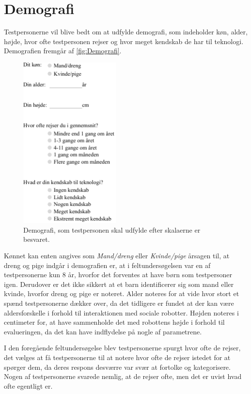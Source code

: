 \section{Demografi}
\label{Demografi}
%
Testpersonerne vil blive bedt om at udfylde demografi, som indeholder køn, alder, højde, hvor ofte testpersonen rejser og hvor meget kendskab de har til teknologi. Demografien fremgår af \autoref{fig:Demografi}.
%
\begin{figure}[H]
\centering
\includegraphics[width = 0.45\textwidth]{Figure/TestdesignEvaluering/Demografi} 
\caption{Demografi, som testpersonen skal udfylde efter skalaerne er besvaret.}
\label{fig:Demografi}
\end{figure}
\noindent
%
Kønnet kan enten angives som \textit{Mand/dreng} eller \textit{Kvinde/pige} årsagen til, at dreng og pige indgår i demografien er, at i feltundersøgelsen var en af testpersonerne kun 8 år, hvorfor det forventes at have børn som testpersoner igen. Derudover er det ikke sikkert at et barn identificerer sig som mand eller kvinde, hvorfor dreng og pige er noteret. Alder noteres for at vide hvor stort et spænd testpersonerne dækker over, da det tidligere er fundet at der kan være aldersforskelle i forhold til interaktionen med sociale robotter. Højden noteres i centimeter for, at have sammenholde det med robottens højde i forhold til evalueringen, da det kan have indflydelse på nogle af parametrene. 

I den foregående feltundersøgelse blev testpersonerne spurgt hvor ofte de rejser, det vælges at få testpersonerne til at notere hvor ofte de rejser istedet for at spørger dem, da deres respons desværre var svær at fortolke og kategorisere. Nogen af testpersonerne svarede nemlig, at de rejser ofte, men det er uvist hvad ofte egentligt er.   

